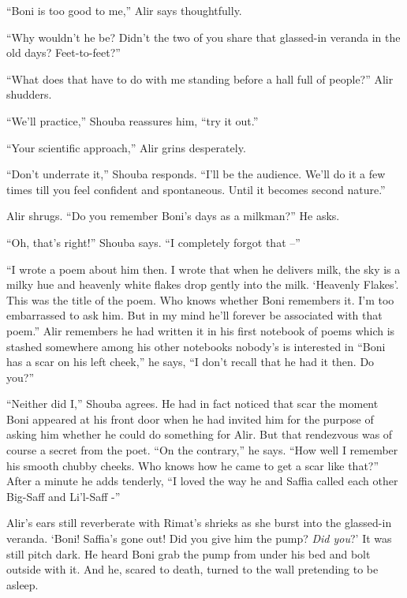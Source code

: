 \documentclass[twoside,11pt]{book}
\begin{document}
``Boni is too good to me,'' Alir says thoughtfully.

``Why wouldn't he be? Didn't the two of you share that glassed-in veranda in the old days?
Feet-to-feet?''

``What does that have to do with me standing before a hall full of people?'' Alir shudders.

``We'll practice,'' Shouba reassures him, ``try it out.''

``Your scientific approach,'' Alir grins desperately.

``Don't underrate it,'' Shouba responds. ``I'll be the audience. We'll do it a
few times till you feel confident and spontaneous. Until it becomes second nature.''

Alir shrugs. ``Do you remember Boni's days as a milkman?'' He asks.

``Oh, that's right!'' Shouba says. ``I completely forgot that --''

``I wrote a poem about him then. I wrote that when he delivers milk, the sky is a milky hue and heavenly
white flakes drop gently into the milk. `Heavenly Flakes'. This was the title of the poem. Who knows whether Boni
remembers it. I'm too embarrassed to ask him. But in my mind he'll forever be associated with that poem.''
Alir remembers he had written it in his first notebook of poems which is stashed somewhere among his other notebooks
nobody's is interested in ``Boni has a scar on his left cheek,'' he says, ``I
don't recall that he had it then. Do you?''

``Neither did I,'' Shouba agrees. He had in fact noticed that scar the moment Boni
appeared at his front door when he had invited him for the purpose of asking him whether he could do something for
Alir. But that rendezvous was of course a secret from the poet. ``On the contrary,'' he says.
``How well I remember his smooth chubby cheeks. Who knows how he came to get a scar like
that?'' After a minute he adds tenderly, ``I loved the way he and  Saffia called each other
Big-Saff and Li'l-Saff -''

Alir's ears still reverberate with Rimat's shrieks as she burst into the glassed-in veranda. `Boni! Saffia's gone
out! Did you give him the pump? \textit{Did you}?' It was still pitch dark. He heard Boni grab the pump from under his
bed and bolt outside with it. And he, scared to death, turned to the wall pretending to be asleep.



\chapter{}
\end{document}
